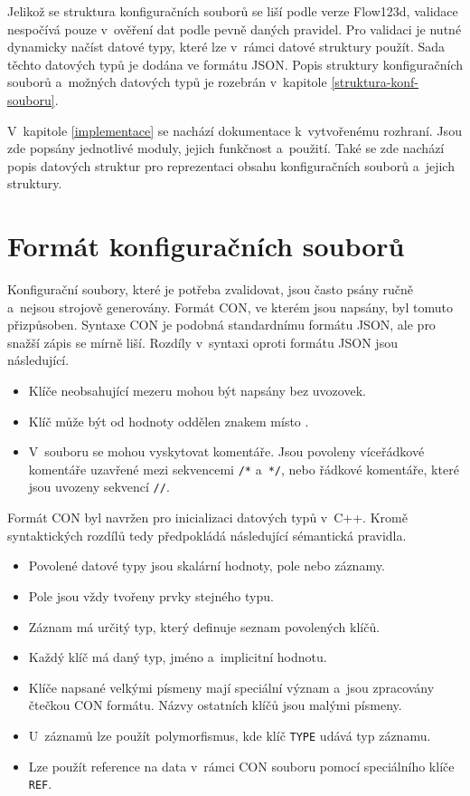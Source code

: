 \documentclass[FM,MP]{tulthesis}
\begin{document}
	Jelikož se struktura konfiguračních souborů se liší podle verze Flow123d, validace nespočívá pouze v~ověření dat podle pevně daných pravidel. Pro validaci je nutné dynamicky načíst datové typy, které lze v~rámci datové struktury použít. Sada těchto datových typů je dodána ve formátu JSON. Popis struktury konfiguračních souborů a~možných datových typů je rozebrán v~kapitole \ref{struktura-konf-souboru}.

	V~kapitole \ref{implementace} se nachází dokumentace k~vytvořenému rozhraní. Jsou zde popsány jednotlivé moduly, jejich funkčnost a~použití. Také se zde nachází popis datových struktur pro reprezentaci obsahu konfiguračních souborů a~jejich struktury.


\chapter{Formát konfiguračních souborů}
	\label{format-con}
	Konfigurační soubory, které je potřeba zvalidovat, jsou často psány ručně a~nejsou strojově generovány. Formát CON, ve kterém jsou napsány, byl tomuto přizpůsoben. Syntaxe CON je podobná standardnímu formátu JSON, ale pro snažší zápis se mírně liší. Rozdíly v~syntaxi oproti formátu JSON jsou následující.
	\begin{itemize}
		\item Klíče neobsahující mezeru mohou být napsány bez uvozovek.
		\item Klíč může být od hodnoty oddělen znakem \uv{\texttt{$=$}} místo \uv{\texttt{$:$}}.
		\item V~souboru se mohou vyskytovat komentáře. Jsou povoleny víceřádkové komentáře uzavřené mezi sekvencemi \texttt{/*} a~\texttt{*/}, nebo řádkové komentáře, které jsou uvozeny sekvencí \texttt{//}.
	\end{itemize}


	\label{semantika-con}
	Formát CON byl navržen pro inicializaci datových typů v~C++. Kromě syntaktických rozdílů tedy předpokládá následující sémantická pravidla.
	\begin{itemize}
		\item Povolené datové typy jsou skalární hodnoty, pole nebo záznamy.
		\item Pole jsou vždy tvořeny prvky stejného typu.
		\item Záznam má určitý typ, který definuje seznam povolených klíčů.
		\item Každý klíč má daný typ, jméno a~implicitní hodnotu.
		\item Klíče napsané velkými písmeny mají speciální význam a~jsou zpracovány čtečkou CON formátu. Názvy ostatních klíčů jsou malými písmeny.
		\item U~záznamů lze použít polymorfismus, kde klíč \texttt{TYPE} udává typ záznamu.
		\item Lze použít reference na data v~rámci CON souboru pomocí speciálního klíče \texttt{REF}.
	\end{itemize}
\end{document}
